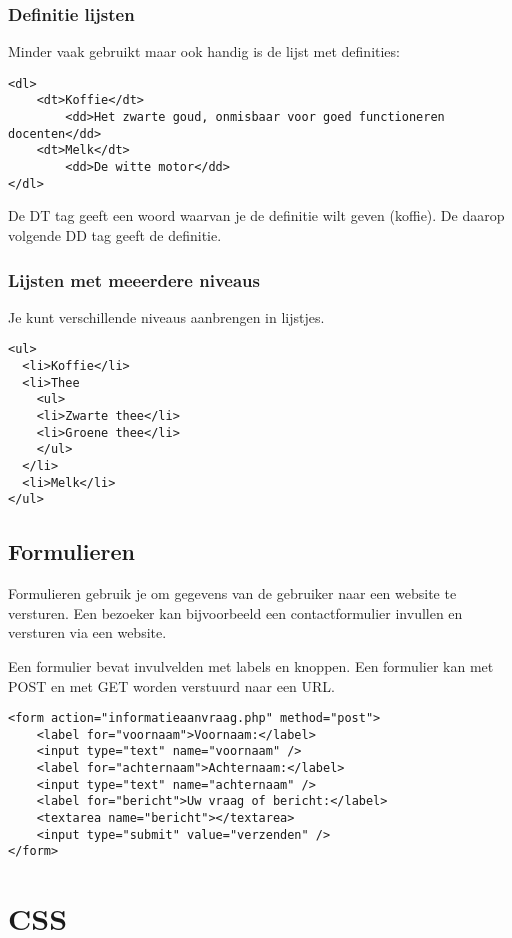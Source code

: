 \documentclass[8pt,pagesize,footinclude=false,headinclude=false]{scrartcl}
\begin{document}
\begin{multicols*}{4}
\subsubsection*{Definitie lijsten}
Minder vaak gebruikt maar ook handig is de lijst met definities:
\begin{lstlisting}[language=HTML5]
<dl>
	<dt>Koffie</dt>
		<dd>Het zwarte goud, onmisbaar voor goed functioneren docenten</dd>
	<dt>Melk</dt>
		<dd>De witte motor</dd>
</dl>
\end{lstlisting}
\noindent De DT tag geeft een woord waarvan je de definitie wilt geven (koffie). De daarop volgende DD tag geeft de definitie.

\subsubsection*{Lijsten met meeerdere niveaus}
Je kunt verschillende niveaus aanbrengen in lijstjes.

\begin{lstlisting}[language=HTML5]
<ul>
  <li>Koffie</li>
  <li>Thee
    <ul>
    <li>Zwarte thee</li>
    <li>Groene thee</li>
    </ul>
  </li>
  <li>Melk</li>
</ul>
\end{lstlisting}

\subsection*{Formulieren}
Formulieren gebruik je om gegevens van de gebruiker naar een website te versturen. Een bezoeker kan bijvoorbeeld een contactformulier invullen en versturen via een website.

Een formulier bevat invulvelden met labels en knoppen. Een formulier kan met POST en met GET worden verstuurd naar een URL.

\begin{lstlisting}[language=HTML5]
<form action="informatieaanvraag.php" method="post">
	<label for="voornaam">Voornaam:</label>
	<input type="text" name="voornaam" />
	<label for="achternaam">Achternaam:</label>
	<input type="text" name="achternaam" />
	<label for="bericht">Uw vraag of bericht:</label>
	<textarea name="bericht"></textarea>
	<input type="submit" value="verzenden" />
</form>
\end{lstlisting}

\clearpage

\section*{CSS}

\end{multicols*}
\end{document}
